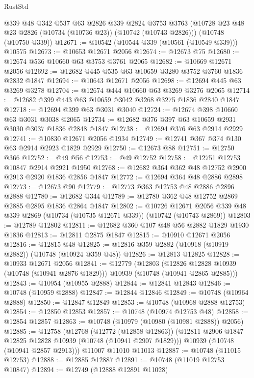 \begin{lexlean}{RustStd}
\begin{coremodule}
    @339
    @48
    @342
    @537
    @63
    @2826
    @339
    @2824
    @3753
    @3763
    (@10728 @23 @48 @23 @2826 (@10734 (@10736 @23)) (@10742 (@10743 @2826)))
    (@10748 (@10750 @339))
@12671 := @10542 (@10544 @339 (@10561 (@10549 @339))) @10575
@12673 := @10653 @12671 @2056
@12674 := @12673 @75
@12680 := @12674 @536 @10660 @63 @3753 @3761 @2065
@12682 := @10669 @12671 @2056
@12692 := @12682 @445 @535 @63 @10659 @3280 @3752 @3760 @1836 @2832 @1847
@12694 := @10643 @12671 @2056
@12698 := @12694 @445 @63 @3269 @3278
@12704 := @12674 @444 @10660 @63 @3269 @3276 @2065
@12714 := @12682 @399 @443 @63 @10659 @3042 @3268 @3275 @1836 @2840 @1847
@12718 := @12694 @399 @63 @3031 @3040
@12724 := @12674 @398 @10660 @63 @3031 @3038 @2065
@12734 := @12682 @376 @397 @63 @10659 @2931 @3030 @3037 @1836 @2848 @1847
@12738 := @12694 @376 @63 @2914 @2929
@12741 := @10830 @12671 @2056 @1934
@12749 := @12741 @367 @374 @130 @63 @2914 @2923 @1829 @2929
@12750 := @12673 @88
@12751 := @12750 @366
@12752 := @49 @56
@12753 := @49 @12752
@12758 := @12751 @12753 @10847 @2914 @2921 @1950
@12768 := @12682 @364 @362 @48 @12752 @2900 @2913 @2920 @1836 @2856 @1847
@12772 := @12694 @364 @48 @2886 @2898
@12773 := @12673 @90
@12779 := @12773 @363 @12753 @48 @2886 @2896 @2888
@12780 := @12682 @344
@12789 := @12780 @362 @48 @12752 @2869 @2885 @2895 @1836 @2864 @1847
@12802 := @10726
    @12671
    @2056
    @339
    @48
    @339
    @2869
    (@10734 (@10735 @12671 @339))
    (@10742 (@10743 @2869))
@12803 := @12789 @12802
@12811 := @12682 @360 @107 @48 @56 @2882 @1829 @1930 @1836
@12813 := @12811 @2875 @1847
@12815 := @10910 @12671 @2056
@12816 := @12815 @48
@12825 := @12816 @359 @2882 (@10918 (@10919 @2882)) (@10748 (@10924 @359 @48))
@12826 := @12813 @12825
@12828 := @10933 @12671 @2056
@12841 := @12779
    (@12803
      (@12826 @12828 @10939 (@10748 (@10941 @2876 @1829)))
      @10939
      (@10748 (@10941 @2865 @2885)))
@12843 := @10954 (@10955 @2888)
@12844 := @12841 @12843
@12846 := @10748 (@10959 @2888)
@12847 := @12844 @12846
@12849 := @10748 (@10964 @2888)
@12850 := @12847 @12849
@12853 := @10748 (@10968 @2888 @12753)
@12854 := @12850 @12853
@12857 := @10748 (@10974 @12753 @48)
@12858 := @12854 @12857
@12863 := @10748 (@10979 (@10980 (@10981 @2888)) @2056)
@12885 := @12758
    (@12768
      (@12772 (@12858 @12863))
      (@12811 @2906 @1847 @12825 @12828 @10939 (@10748 (@10941 @2907 @1829)))
      @10939
      (@10748 (@10941 @2857 @2913)))
    @11007
    @11010
    @11013
@12887 := @10748 (@11015 @12753)
@12888 := @12885 @12887
@12891 := @10748 (@11019 @12753 @10847)
@12894 := @12749 (@12888 @12891 @11028)

\end{coremodule}
\end{lexlean}
